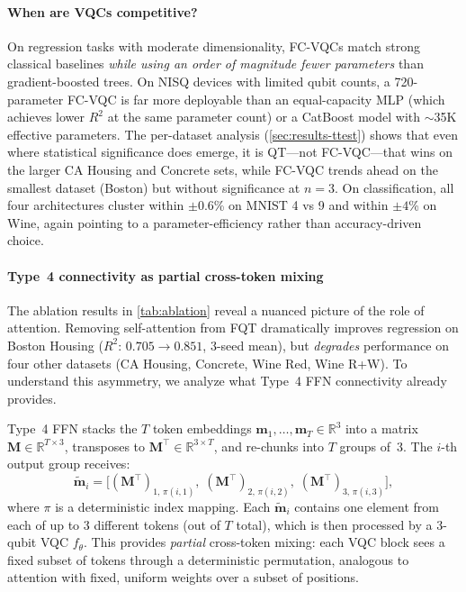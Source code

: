 \documentclass[10pt,conference]{IEEEtran}
\begin{document}
\paragraph{When are VQCs competitive?}
On regression tasks with moderate dimensionality, FC-VQCs match strong classical baselines \emph{while using an order of magnitude fewer parameters} than gradient-boosted trees.
On NISQ devices with limited qubit counts, a 720-parameter FC-VQC is far more deployable than an equal-capacity MLP (which achieves lower $R^2$ at the same parameter count) or a CatBoost model with ${\sim}$35K effective parameters.
The per-dataset analysis (\cref{sec:results-ttest}) shows that even where statistical significance does emerge, it is QT---not FC-VQC---that wins on the larger CA Housing and Concrete sets, while FC-VQC trends ahead on the smallest dataset (Boston) but without significance at $n{=}3$.
On classification, all four architectures cluster within $\pm 0.6$\% on MNIST 4 vs 9 and within $\pm 4$\% on Wine, again pointing to a parameter-efficiency rather than accuracy-driven choice.

\paragraph{Type~4 connectivity as partial cross-token mixing}

The ablation results in \cref{tab:ablation} reveal a nuanced picture of the role of attention.
Removing self-attention from FQT dramatically improves regression on Boston Housing ($R^2$: $0.705 \to 0.851$, 3-seed mean), but \emph{degrades} performance on four other datasets (CA Housing, Concrete, Wine Red, Wine R+W).
To understand this asymmetry, we analyze what Type~4 FFN connectivity already provides.

Type~4 FFN stacks the $T$ token embeddings $\mathbf{m}_1, \dots, \mathbf{m}_T \in \mathbb{R}^3$ into a matrix $\mathbf{M} \in \mathbb{R}^{T \times 3}$, transposes to $\mathbf{M}^\top \in \mathbb{R}^{3 \times T}$, and re-chunks into $T$ groups of~3.
The $i$-th output group receives:
\begin{equation}
    \tilde{\mathbf{m}}_i = \bigl[
        (\mathbf{M}^\top)_{1,\, \pi(i,1)},\;
        (\mathbf{M}^\top)_{2,\, \pi(i,2)},\;
        (\mathbf{M}^\top)_{3,\, \pi(i,3)}
    \bigr],
    \label{eq:type4-mixing}
\end{equation}
where $\pi$ is a deterministic index mapping.
Each $\tilde{\mathbf{m}}_i$ contains one element from each of up to 3 different tokens (out of $T$ total), which is then processed by a 3-qubit VQC $f_\theta$.
This provides \emph{partial} cross-token mixing: each VQC block sees a fixed subset of tokens through a deterministic permutation, analogous to attention with fixed, uniform weights over a subset of positions.
\end{document}
